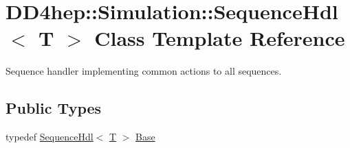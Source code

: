 \hypertarget{class_d_d4hep_1_1_simulation_1_1_sequence_hdl}{}\section{D\+D4hep\+:\+:Simulation\+:\+:Sequence\+Hdl$<$ T $>$ Class Template Reference}
\label{class_d_d4hep_1_1_simulation_1_1_sequence_hdl}


Sequence handler implementing common actions to all sequences.  


\subsection*{Public Types}
\begin{DoxyCompactItemize}
\item 
typedef \hyperlink{class_d_d4hep_1_1_simulation_1_1_sequence_hdl}{Sequence\+Hdl}$<$ \hyperlink{class_t}{T} $>$ \hyperlink{class_d_d4hep_1_1_simulation_1_1_sequence_hdl_a447b2bee9267559ffef742eef84fb1cc}{Base}
\end{DoxyCompactItemize}
